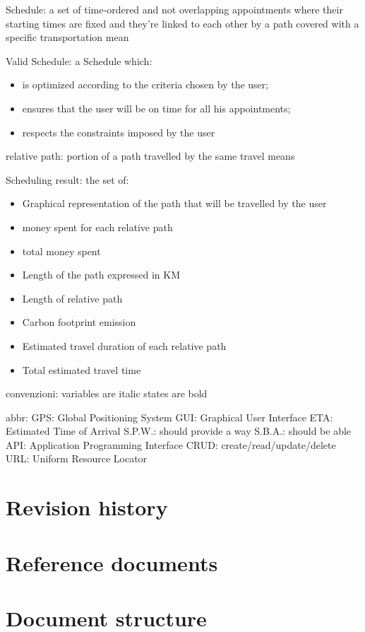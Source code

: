 Schedule: a set of time-ordered and not overlapping appointments where their starting times are fixed and they're linked to each other by a path covered with a specific transportation mean

Valid Schedule: a Schedule which:
\begin{itemize}
\item is optimized according to the criteria chosen by the user;
\item ensures that the user will be on time for all his appointments;
\item respects the constraints imposed by the user
\end{itemize}

relative path: portion of a path travelled by the same travel means 

Scheduling result: the set of:
\begin{itemize}
\item Graphical representation of the path that will be travelled by the user
\item money spent for each relative path
\item total money spent 
\item Length of the path expressed in KM
\item Length of relative path 
\item Carbon footprint emission
\item Estimated travel duration of each relative path
\item Total estimated travel time
\end{itemize}

convenzioni:
variables are italic
states are bold

abbr:
GPS: Global Positioning System
GUI: Graphical User Interface
ETA: Estimated Time of Arrival
S.P.W.: should provide a way
S.B.A.: should be able 
API: Application Programming Interface
CRUD: create/read/update/delete
URL: Uniform Resource Locator


\section{Revision history}

\section{Reference documents}

\section{Document structure}